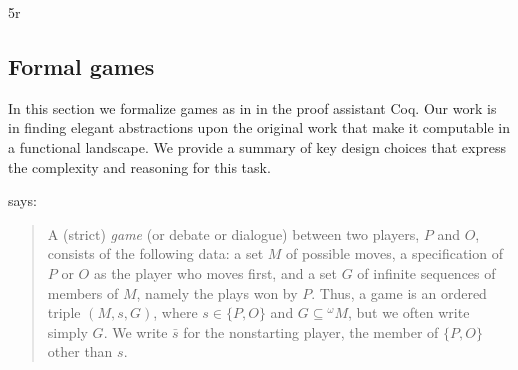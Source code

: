 5r\documentclass{article}
\theoremstyle{definition}
\begin{document}
\subsection{Formal games}
In this section we formalize games as in \textcite{Blass1992} in the proof assistant Coq. Our work is in finding elegant abstractions upon the original work that make it computable in a functional landscape. We provide a summary of key design choices that express the complexity and reasoning for this task. 

\textcite[p.~187]{Blass1992} says:
\begin{quote}
A (strict) \emph{game} (or debate or dialogue) between two players, $P$ and $O$, consists of the following data: a set $M$ of possible moves, a specification of $P$ or $O$ as the player who moves first, and a set $G$ of infinite sequences of members of $M$, namely the plays won by $P$. Thus, a game is an ordered triple $(M, s, G)$, where $s \in \{P, O\}$ and $G \subseteq {}^\omega M$, but we often write simply $G$. We write $\bar s$ for the nonstarting player, the member of $\{P, O\}$ other than $s$.
\end{quote}
\end{document}
